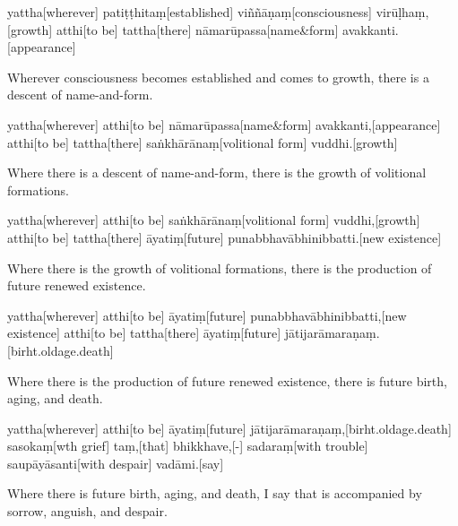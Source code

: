 \begin{samepage}
\begingl[glneveryline={\PaliGlossA,\PaliGlossB}]
yattha[wherever] patiṭṭhitaṃ[established] viññāṇaṃ[consciousness] virūḷhaṃ,[growth] atthi[to be] tattha[there] nāmarūpassa[name\&form] avakkanti.[appearance]
\endgl
\nopagebreak
\linespread{0.5}
\begin{spacin}{0.2}
{\PaliGlossFT Wherever consciousness becomes established and comes to growth, there is a descent of name-and-form.}
\end{spacin}
\vskip 12pt
\end{samepage}
\begin{samepage}
\begingl[glneveryline={\PaliGlossA,\PaliGlossB}]
yattha[wherever] atthi[to be] nāmarūpassa[name\&form] avakkanti,[appearance] atthi[to be] tattha[there] saṅkhārānaṃ[volitional form] vuddhi.[growth]
\endgl
\nopagebreak
\linespread{0.5}
\begin{spacin}{0.2}
{\PaliGlossFT Where there is a descent of name-and-form, there is the growth of volitional formations.}
\end{spacin}
\vskip 12pt
\end{samepage}
\begin{samepage}
\begingl[glneveryline={\PaliGlossA,\PaliGlossB}]
yattha[wherever] atthi[to be] saṅkhārānaṃ[volitional form] vuddhi,[growth] atthi[to be] tattha[there] āyatiṃ[future] punabbhavābhinibbatti.[new existence]
\endgl
\nopagebreak
\linespread{0.5}
\begin{spacin}{0.2}
{\PaliGlossFT Where there is the growth of volitional formations, there is the production of future renewed existence.}
\end{spacin}
\vskip 12pt
\end{samepage}
\begin{samepage}
\begingl[glneveryline={\PaliGlossA,\PaliGlossB}]
yattha[wherever] atthi[to be] āyatiṃ[future] punabbhavābhinibbatti,[new existence] atthi[to be] tattha[there] āyatiṃ[future] jātijarāmaraṇaṃ.[birht.oldage.death]
\endgl
\nopagebreak
\linespread{0.5}
\begin{spacin}{0.2}
{\PaliGlossFT Where there is the production of future renewed existence, there is future birth, aging, and death.}
\end{spacin}
\vskip 12pt
\end{samepage}
\begin{samepage}
\begingl[glneveryline={\PaliGlossA,\PaliGlossB}]
yattha[wherever] atthi[to be] āyatiṃ[future] jātijarāmaraṇaṃ,[birht.oldage.death] sasokaṃ[wth grief] taṃ,[that] bhikkhave,[-] sadaraṃ[with trouble] saupāyāsanti[with despair] vadāmi.[say]
\endgl
\nopagebreak
\linespread{0.5}
\begin{spacin}{0.2}
{\PaliGlossFT Where there is future birth, aging, and death, I say that is accompanied by sorrow, anguish, and despair.}
\end{spacin}
\vskip 12pt
\end{samepage}
